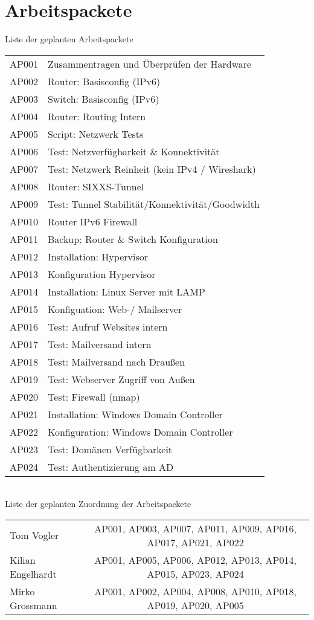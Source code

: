 \section{Arbeitspackete}
Liste der geplanten Arbeitspackete\\
\noindent \begin{tabular}{|l|l|}
\hline
AP001 & Zusammentragen und Überprüfen der Hardware \\
AP002 & Router: Basisconfig (IPv6) \\
AP003 & Switch: Basisconfig (IPv6) \\
AP004 & Router: Routing Intern \\
AP005 & Script: Netzwerk Tests \\
AP006 & Test: Netzverfügbarkeit \& Konnektivität \\
AP007 & Test: Netzwerk Reinheit (kein IPv4 / Wireshark) \\
AP008 & Router: SIXXS-Tunnel \\
AP009 & Test: Tunnel Stabilität/Konnektivität/Goodwidth \\
AP010 & Router IPv6 Firewall \\
AP011 & Backup: Router \& Switch Konfiguration \\
AP012 & Installation: Hypervisor \\
AP013 & Konfiguration Hypervisor \\
AP014 & Installation: Linux Server mit LAMP \\
AP015 & Konfiguation: Web-/ Mailserver \\
AP016 & Test: Aufruf Websites intern \\
AP017 & Test: Mailversand intern \\
AP018 & Test: Mailversand nach Draußen \\
AP019 & Test: Webserver Zugriff von Außen \\
AP020 & Test: Firewall (nmap) \\
AP021 & Installation: Windows Domain Controller \\
AP022 & Konfiguration: Windows Domain Controller \\
AP023 & Test: Domänen Verfügbarkeit \\
AP024 & Test: Authentizierung am AD \\
\hline
\end{tabular}
\vspace{0.5cm}\\
Liste der geplanten Zuordnung der Arbeitspackete\\
\noindent \begin{tabular}{|l|c|}
\hline
Tom Vogler & AP001, AP003, AP007, AP011, AP009, AP016, AP017, AP021, AP022 \\
Kilian Engelhardt & AP001, AP005, AP006, AP012, AP013, AP014, AP015, AP023, AP024 \\
Mirko Grossmann & AP001, AP002, AP004, AP008, AP010, AP018, AP019, AP020, AP005 \\
\hline
\end{tabular}
